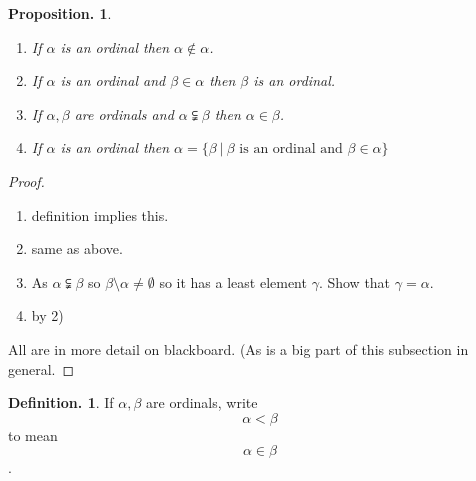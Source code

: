 \documentclass[a4paper,oneside,11pt,DIV=12,parskip=half]{scrartcl}
\theoremstyle{plain}
\newtheorem{proposition}[theorem]{Proposition.}
\theoremstyle{definition}
\newtheorem{definition}[theorem]{Definition.}
\newtheorem{remark, definition}[theorem]{Remark and Definition.}
\newtheorem{lemma, definition}[theorem]{Lemma and Definition.}
\newtheorem{theorem, definition}[theorem]{Theorem and Definition.}
\theoremstyle{remark}
\newtheorem*{remark, example}{\textbf{Remark and Exercise}}
\begin{document}
\begin{proposition}\label{Prop:Ordinal_attributes}
\begin{enumerate}
    \item If $\alpha$ is an ordinal then $\alpha \not \in \alpha$.
    \item If $\alpha$ is an ordinal and $\beta \in \alpha$ then $\beta$ is an ordinal.
    \item If $\alpha,\beta$ are ordinals and $\alpha \subsetneqq \beta$ then $\alpha \in \beta$.
    \item If $\alpha$ is an ordinal then $\alpha = \{ \beta ~|~ \beta \text{ is an ordinal and } \beta \in \alpha  \}$
\end{enumerate}
\end{proposition}

\begin{proof}
\begin{enumerate}
    \item definition implies this.
    \item same as above.
    \item As $ \alpha \subsetneqq \beta $ so $\beta \setminus \alpha \neq \emptyset$ so it has a least element $\gamma$. Show that $\gamma = \alpha$.
    \item by 2)
\end{enumerate}
All are in more detail on blackboard. (As is a big part of this subsection in general.
\end{proof}

\begin{definition}
If $\alpha, \beta$ are ordinals, write
\[ \alpha < \beta \] to mean
\[ \alpha \in \beta \].
\end{definition}
\end{document}
